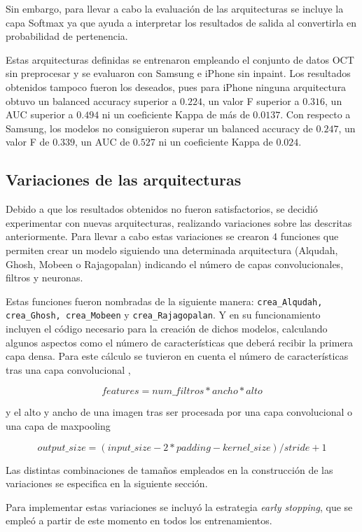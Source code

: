 Sin embargo, para llevar a cabo la evaluación de las arquitecturas se incluye la capa Softmax ya que ayuda a interpretar los resultados de salida al convertirla en probabilidad de pertenencia.

Estas arquitecturas definidas se entrenaron empleando el conjunto de datos OCT sin preprocesar y se evaluaron con Samsung e iPhone sin inpaint. Los resultados obtenidos tampoco fueron los deseados, pues para iPhone ninguna arquitectura obtuvo un balanced accuracy superior a $0.224$, un valor F superior a $0.316$, un AUC superior a $0.494$ ni un coeficiente Kappa de más de $0.0137$. Con respecto a Samsung, los modelos no consiguieron superar un balanced accuracy de $0.247$, un valor F de $0.339$, un AUC de $0.527$ ni un coeficiente Kappa de $0.024$.

\subsection{Variaciones de las arquitecturas}

Debido a que los resultados obtenidos no fueron satisfactorios, se decidió experimentar con nuevas arquitecturas, realizando variaciones sobre las descritas anteriormente. Para llevar a cabo estas variaciones se crearon 4 funciones que permiten crear un modelo siguiendo una determinada arquitectura (Alqudah, Ghosh, Mobeen o Rajagopalan) indicando el número de capas convolucionales, filtros y neuronas.

Estas funciones fueron nombradas de la siguiente manera: \texttt{crea\_Alqudah, crea\_Ghosh, crea\_Mobeen} y \texttt{crea\_Rajagopalan}. Y en su funcionamiento incluyen el código necesario para la creación de dichos modelos, calculando algunos aspectos como el número de características que deberá recibir la primera capa densa. Para este cálculo se tuvieron en cuenta el número de características tras una capa convolucional \cite{cnn:biblia_deeplearning}, 

$$features = num\_filtros*ancho*alto$$

y el alto y ancho de una imagen tras ser procesada por una capa convolucional o una capa de maxpooling \cite{deepl:compvision}

$$output\_size = (input\_size - 2*padding-kernel\_size)/stride + 1$$

Las distintas combinaciones de tamaños empleados en la construcción de las variaciones se especifica en la siguiente sección.

Para implementar estas variaciones se incluyó la estrategia \textit{early stopping}, que se empleó a partir de este momento en todos los entrenamientos.

